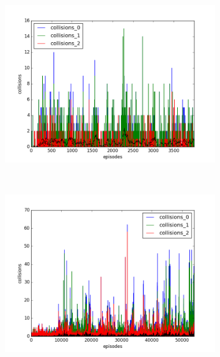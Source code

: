 \begin{figure}[t]
  \vspace{-0.5cm}
  \begin{subfigure}[t]{\figscale\linewidth}
    \hspace*{-2.75cm}
    \includegraphics[width=1.5\textwidth]
    {../results/dqn_2vs1/collisions.png}
    \label{fig:dqn-2vs1-collisions}
  \end{subfigure}
  ~
  \begin{subfigure}[t]{\figscale\linewidth}
    \hspace*{-1.4cm}
    \includegraphics[width=1.5\textwidth]
    {../results/ddpg_2vs1/collisions.png}
    \label{fig:ddpg-2vs1-collisions}
  \end{subfigure}
  ~
  \begin{subfigure}[t]{\figscale\linewidth}

\end{subfigure}
\end{figure}
